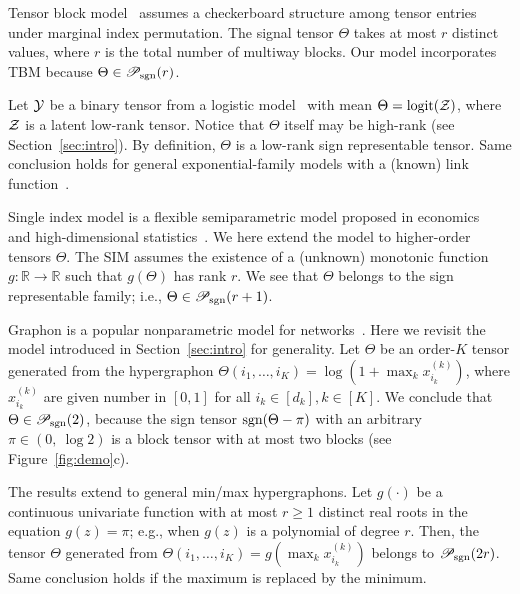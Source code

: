 \documentclass[useAMS,usenatbib,usegraphicx,referee]{biom}
\theoremstyle{plain}
\theoremstyle{definition}
\def\sign{\textup{sgn}}
\def\caliP{\mathscr{P}_{\textup{sgn}}}
\begin{document}
\begin{example} Tensor block model~\citep{wang2019multiway,chi2020provable} assumes a checkerboard structure among tensor entries under marginal index permutation. The signal tensor $\Theta$ takes at most $r$ distinct values, where $r$ is the total number of multiway blocks. Our model incorporates TBM because $\Theta \in \caliP(r)$. 
\end{example}
\vspace{-.3cm}


\begin{example} Let $\mathcal{Y}$ be a binary tensor from a logistic model~\citep{wang2018learning} with mean $\Theta=\text{logit}(\mathcal{Z})$, where $\mathcal{Z}$ is a latent low-rank tensor. Notice that $\Theta$ itself may be high-rank (see Section~\ref{sec:intro}). By definition, $\Theta$ is a low-rank sign representable tensor. Same conclusion holds for general exponential-family models with a (known) link function~\citep{hong2020generalized}. 
\end{example}
\vspace{-.3cm}

\begin{example} Single index model is a flexible semiparametric model proposed in economics~\citep{robinson1988root} and high-dimensional statistics~\citep{balabdaoui2019least,ganti2017learning}. We here extend the model to higher-order tensors $\Theta$. The SIM assumes the existence of a (unknown) monotonic function $g\colon \mathbb{R}\to \mathbb{R}$ such that $g(\Theta)$ has rank $r$. We see that $\Theta$ belongs to the sign representable family; i.e., $\Theta\in \caliP(r+1)$. 
\end{example}
\vspace{-.3cm}

\begin{example}\label{eq:example}Graphon is a popular nonparametric model for networks~\citep{chan2014consistent,xu2018rates}. Here we revisit the model introduced in Section~\ref{sec:intro} for generality. Let $\Theta$ be an order-$K$ tensor generated from the hypergraphon $\Theta(i_1,\ldots,i_K)=\log(1+\max_kx^{(k)}_{i_k})$, where $x^{(k)}_{i_k}$ are given number in $[0,1]$ for all $i_k\in[d_k], k\in[K]$. We conclude that $\Theta \in \caliP(2)$, because the sign tensor $\sign(\Theta-\pi)$ with an arbitrary $\pi\in(0,\ \log 2)$ is a block tensor with at most two blocks (see Figure~\ref{fig:demo}c).

The results extend to general min/max hypergraphons. Let $g(\cdot)$ be a continuous univariate function with at most $r\geq 1$ distinct real roots in the equation $g(z)=\pi$; e.g., when $g(z)$ is a polynomial of degree $r$. Then, the tensor $\Theta$ generated from $\Theta(i_1,\ldots,i_K)=g(\max_kx^{(k)}_{i_k})$ belongs to $\caliP(2r)$. Same conclusion holds if the maximum is replaced by the minimum. 
\end{example}
\end{document}
